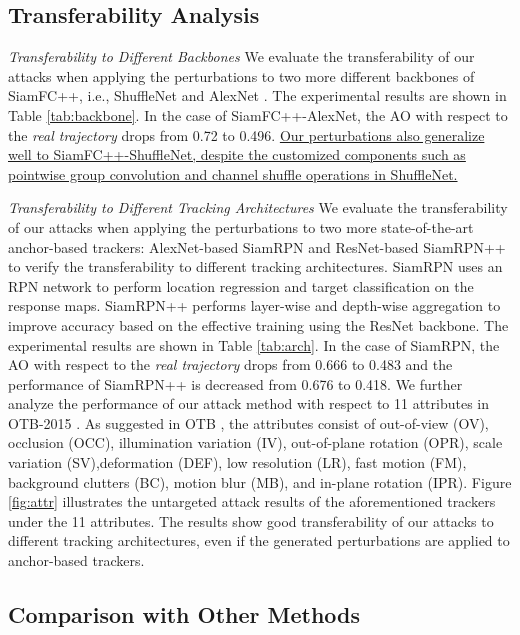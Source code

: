 \documentclass[journal]{IEEEtran}
\newcommand{\ie}{i.e.}
\begin{document}
\subsection{Transferability Analysis}

\textit{Transferability to Different Backbones} We evaluate the transferability of our attacks when applying the perturbations to two more different backbones of SiamFC++, \ie, ShuffleNet \cite{ShuffleNet} and AlexNet \cite{AlexNet}.
The experimental results are shown in Table \ref{tab:backbone}. In the case of SiamFC++-AlexNet, the AO with respect to the \textit{real trajectory} drops from 0.72 to 0.496. 
\uline{
Our perturbations also generalize well to SiamFC++-ShuffleNet, despite the customized components such as pointwise group convolution and channel shuffle operations in ShuffleNet.
}

\textit{Transferability to Different Tracking Architectures} We evaluate the transferability of our attacks when applying the perturbations to two more state-of-the-art anchor-based trackers: AlexNet-based SiamRPN \cite{SiamRPN} and ResNet-based SiamRPN++ \cite{SiamRPN++} to verify the transferability to different tracking architectures.
SiamRPN uses an RPN network to perform location regression and target classification on the response maps. SiamRPN++ performs layer-wise and depth-wise aggregation to improve accuracy based on the effective training using the ResNet backbone. The experimental results are shown in Table \ref{tab:arch}. In the case of SiamRPN, the AO with respect to the \textit{real trajectory} drops from 0.666 to 0.483 and the performance of SiamRPN++ is decreased from 0.676 to 0.418. We further analyze the performance of our attack method with respect to 11 attributes in OTB-2015 \cite{OTB}. As suggested in OTB \cite{OTB}, the attributes consist of out-of-view (OV), occlusion (OCC), illumination variation (IV), out-of-plane rotation (OPR), scale variation (SV),deformation (DEF), low resolution (LR), fast motion (FM), background clutters (BC), motion blur (MB), and in-plane rotation (IPR). Figure \ref{fig:attr} illustrates the untargeted attack results of the aforementioned trackers under the 11 attributes. The results show good transferability of our attacks to different tracking architectures, even if the generated perturbations are applied to anchor-based trackers.

\subsection{Comparison with Other Methods}
\end{document}
